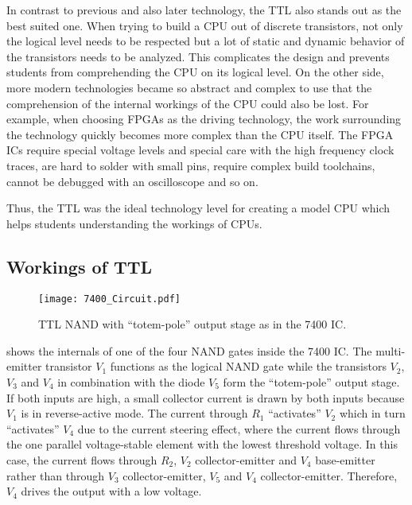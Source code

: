 In contrast to previous and also later technology, the \gls{TTL} also stands out as the best suited one.
When trying to build a \gls{CPU} out of discrete transistors, not only the logical level needs to be respected but a lot of static and dynamic behavior of the transistors needs to be analyzed.
This complicates the design and prevents students from comprehending the \gls{CPU} on its logical level.
On the other side, more modern technologies became so abstract and complex to use that the comprehension of the internal workings of the \gls{CPU} could also be lost.
For example, when choosing \glspl{FPGA} as the driving technology, the work surrounding the technology quickly becomes more complex than the \gls{CPU} itself.
The \gls{FPGA} \glspl{IC} require special voltage levels and special care with the high frequency clock traces, are hard to solder with small pins, require complex build toolchains, cannot be debugged with an oscilloscope and so on.

Thus, the \gls{TTL} was the ideal technology level for creating a model \gls{CPU} which helps students understanding the workings of \glspl{CPU}.

\subsection{Workings of \gls{TTL}}\label{sec:ttl}
\begin{figure}[t]
  \centering
  \texttt{[image: 7400\_Circuit.pdf]}
  \caption{\gls{TTL} NAND with ``totem-pole'' output stage as in the 7400 \gls{IC}. \cite{7400_Circuit}}
  \label{fig:7400_Circuit}
\end{figure}

 shows the internals of one of the four NAND gates inside the 7400 \gls{IC}.
The multi-emitter transistor $V_1$ functions as the logical NAND gate while the transistors $V_2$, $V_3$ and $V_4$ in combination with the diode $V_5$ form the ``totem-pole'' output stage.
If both inputs are high, a small collector current is drawn by both inputs because $V_1$ is in reverse-active mode.
The current through $R_1$ ``activates'' $V_2$ which in turn ``activates'' $V_4$ due to the current steering effect, where the current flows through the one parallel voltage-stable element with the lowest threshold voltage.
In this case, the current flows through $R_2$, $V_2$ collector-emitter and $V_4$ base-emitter rather than through $V_3$ collector-emitter, $V_5$ and $V_4$ collector-emitter.
Therefore, $V_4$ drives the output with a low voltage.

